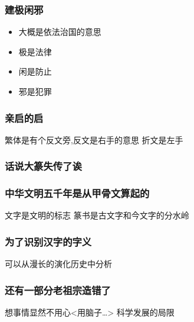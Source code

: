 \documentclass[11pt]{article}
\begin{document}
\subsubsection{建极闲邪}
\label{sec:org3a0ec6b}
\begin{itemize}
\item 大概是依法治国的意思
\item 极是法律
\item 闲是防止
\item 邪是犯罪
\end{itemize}
\subsubsection{亲启的启}
\label{sec:orga59b932}
繁体是有个反文旁,反文是右手的意思
折文是左手
\subsubsection{话说大篆失传了诶}
\label{sec:org00e20b6}
\subsubsection{中华文明五千年是从甲骨文算起的}
\label{sec:org567d1c5}
文字是文明的标志
篆书是古文字和今文字的分水岭
\subsubsection{为了识别汉字的字义}
\label{sec:orgc21762f}
可以从漫长的演化历史中分析
\subsubsection{还有一部分老祖宗造错了}
\label{sec:orge63235d}
想事情显然不用心<用脑子\ldots{}>
科学发展的局限
\end{document}
